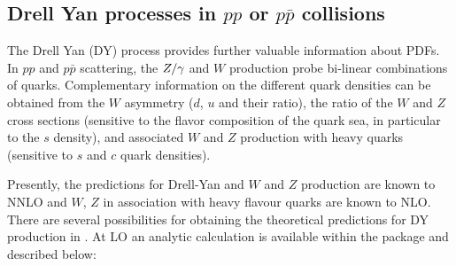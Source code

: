 \subsection{Drell Yan processes  in $pp$ or $p\bar p$ collisions}
\label{dysection}

The Drell Yan (DY) process
provides further valuable information about PDFs.
In $pp$ and $p\bar p$ scattering, the $Z/\gamma\*$ and $W$ production 
probe bi-linear combinations of quarks. 
Complementary information on the different quark densities
can be obtained from the $W$ asymmetry ($d$, $u$ and their ratio),
the ratio of the $W$ and $Z$ cross sections (sensitive to the flavor 
composition of the quark sea, in particular to the $s$ density), 
and associated $W$ and $Z$ production with
heavy quarks (sensitive to $s$ and $c$ quark densities).
%

Presently, the predictions for Drell-Yan and $W$ and $Z$ production are known 
to NNLO and $W$, $Z$ in association with heavy flavour quarks are known to NLO. There are several possibilities 
for obtaining the theoretical
predictions for DY production in \fitter. 
At LO an analytic calculation is available within the package and described
below: 

